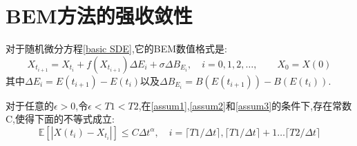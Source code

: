 

\chapter{BEM方法的强收敛性}

对于随机微分方程\cref{basic SDE},它的BEM数值格式是:
\begin{equation}\label{eq:1}
	X_{t_{i+1}}=X_{t_i}+f(X_{t_{i+1}})\Delta E_{i}+\sigma\Delta B_{E_{i}},\quad i=0,1,2,\ldots,\qquad X_0=X(0)
\end{equation}
其中$\Delta E_{i}=E(t_{i+1})-E(t_i)$以及$\Delta B_{E_{i}}=B(E{(t_{i+1})})-B(E({t_i}))$.
\begin{theorem}\label{main th}
	对于任意的$\epsilon>0$,令$\epsilon < T1 < T2$,在\cref{assum1},\cref{assum2}和\cref{assum3}的条件下,存在常数C,使得下面的不等式成立:
	$$\mathbb{E}[|X({t_i})-X_{t_i}|]\le C\Delta t^\alpha,\quad i=\lceil T1/\Delta t \rceil,\lceil T1/\Delta t \rceil+1 \ldots \lceil T2/\Delta t \rceil$$
\end{theorem}
